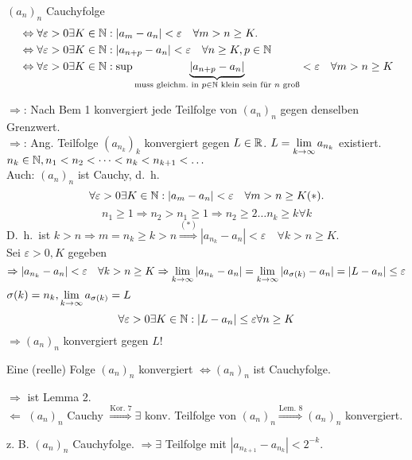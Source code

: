 \documentclass[../ana1.tex]{subfiles}
\begin{document}
\begin{bem}
	\( {(a_n)}_n \) Cauchyfolge \\
	\begin{align*}
		&\Leftrightarrow \forall \varepsilon>0\exists K\in\mathbb{N}:|a_m-a_n|<\varepsilon \quad \forall m>n\geq K.\\
		&\Leftrightarrow \forall \varepsilon>0\exists K\in\mathbb{N}:|a_{n+p}-a_n|<\varepsilon \quad \forall n\geq K, p\in\mathbb{N} \\
		&\Leftrightarrow \forall \varepsilon>0\exists K\in\mathbb{N}:\sup \underbrace{|a_{n+p}-a_n|}_{\text{muss gleichm.\ in }p\in\mathbb{N}\text{ klein sein für } n \text{ groß} }<\varepsilon \quad \forall m>n\geq K
	\end{align*}
\end{bem}
\begin{bew}
	\glqq{}\( \Rightarrow \)\grqq{}: Nach Bem 1 konvergiert jede Teilfolge von \( {(a_n)}_n \) gegen denselben Grenzwert.\\
	\glqq{}\(\Rightarrow \)\grqq{}: Ang. Teilfolge \( {(a_{n_k})}_k \) konvergiert gegen \(L\in\mathbb{R} \). \(L = \lim\limits_{k\rightarrow\infty} a_{n_k} \) existiert.\\
	\( n_k\in\mathbb{N}, n_1<n_2<\cdots<n_k<n_{k+1}<\ldots \) \\
	Auch: \({(a_n)}_n\) ist Cauchy, d.\ h.\ 
	\[ \forall \varepsilon>0\exists K\in\mathbb{N}:|a_m-a_n|<\varepsilon \quad\forall m>n\geq K (*). \]
	\[n_1 \geq 1 \Rightarrow n_2 > n_1 \geq 1 \Rightarrow n_2 \geq 2 \ldots n_k \geq k \forall k \]
	D.\ h.\ ist \(k>n \Rightarrow m=n_k \geq k>n \overset{(*)}{\Rightarrow} |a_{n_k}-a_n|<\varepsilon \quad \forall k>n\geq K \).\\
	Sei \( \varepsilon>0, K\) gegeben\\
	\[ \Rightarrow |a_{n_k} - a_n| <\varepsilon \quad \forall k>n\geq K \Rightarrow \lim\limits_{k\rightarrow\infty} |a_{n_k}-a_n| = \lim\limits_{k\rightarrow\infty} |a_{\sigma(k)}-a_n| = |L-a_n| \leq \varepsilon \]
	\(\sigma(k) = n_k, \lim\limits_{k\rightarrow\infty} a_{\sigma(k)} = L \)
	\[ \forall \varepsilon>0 \exists K\in\mathbb{N}: |L-a_n|\leq \varepsilon \forall n\geq K \]
	\(\Rightarrow {(a_n)}_n\) konvergiert gegen \(L\)!
\end{bew}
\begin{satz}
	Eine (reelle) Folge \({(a_n)}_n\) konvergiert \( \Leftrightarrow {(a_n)}_n \) ist Cauchyfolge.
\end{satz}
\begin{bew}
	\glqq{}\(\Rightarrow \)\grqq{} ist Lemma 2.\\
	\glqq{}\( \Leftarrow \)\grqq{} \({(a_n)}_n\) Cauchy \( \overset{\text{Kor. 7}}{\Rightarrow} \exists \) konv. Teilfolge von \({(a_n)}_n \overset{\text{Lem. 8}}{\Rightarrow} {(a_n)}_n \) konvergiert. 
\end{bew}
z. B. \({(a_n)}_n\) Cauchyfolge. \(\Rightarrow \exists \) Teilfolge mit \(|a_{n_{k+1}}-a_{n_k}| <2^{-k}\).
\end{document}
